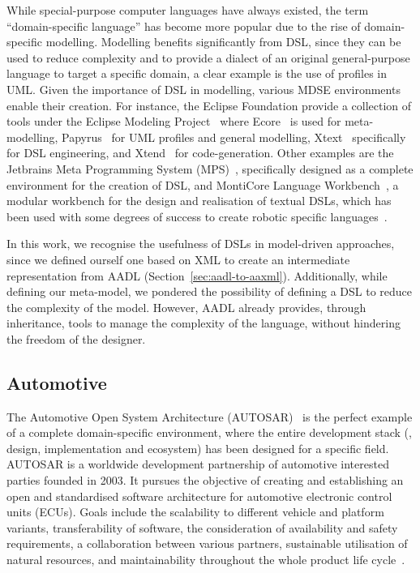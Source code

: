 While special-purpose computer languages have always existed, the term ``domain-specific language'' has become more popular due to the rise of domain-specific modelling. Modelling benefits significantly from DSL, since they can be used to reduce complexity and to provide a dialect of an original general-purpose language to target a specific domain, a clear example is the use of profiles in UML. Given the importance of DSL in modelling, various MDSE environments enable their creation. For instance, the Eclipse Foundation provide a collection of tools under the Eclipse Modeling Project~\cite{gronback2009eclipse} where Ecore~\cite{steinberg2008emf, sciamma2013ecore} is used for meta-modelling, Papyrus~\cite{lanusse2009papyrus} for UML profiles and general modelling, Xtext~\cite{eysholdt2010xtext} specifically for DSL engineering, and Xtend~\cite{bettini2016implementing} for code-generation. Other examples are the Jetbrains Meta Programming System (MPS)~\cite{mps}, specifically designed as a complete environment for the creation of DSL, and MontiCore Language Workbench~\cite{krahn2010monticore}, a modular workbench for the design and realisation of textual DSLs, which has been used with some degrees of success to create robotic specific languages~\cite{thomas2013new}.

In this work, we recognise the usefulness of DSLs in model-driven approaches, since we defined ourself one based on XML to create an intermediate representation from AADL (Section~\ref{sec:aadl-to-aaxml}). Additionally, while defining our meta-model, we pondered the possibility of defining a DSL to reduce the complexity of the model. However, AADL already provides, through inheritance, tools to manage the complexity of the language, without hindering the freedom of the designer.

\subsection{Automotive}
The Automotive Open System Architecture (AUTOSAR)~\cite{furst2009autosar} is the perfect example of a complete domain-specific environment, where the entire development stack (\ie, design, implementation and ecosystem) has been designed for a specific field. AUTOSAR is a worldwide development partnership of automotive interested parties founded in 2003. It pursues the objective of creating and establishing an open and standardised software architecture for automotive electronic control units (ECUs). Goals include the scalability to different vehicle and platform variants, transferability of software, the consideration of availability and safety requirements, a collaboration between various partners, sustainable utilisation of natural resources, and maintainability throughout the whole product life cycle~\cite{autosar}.

